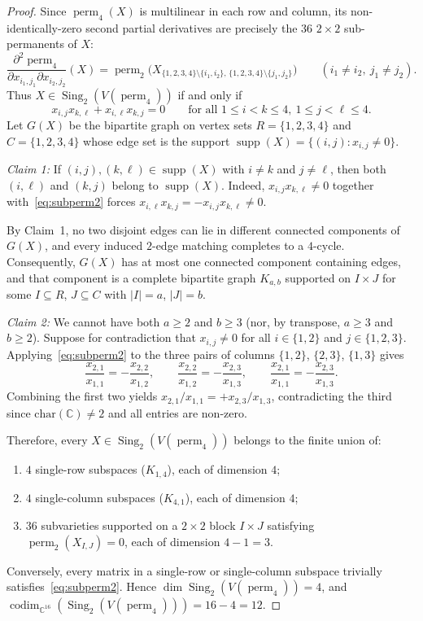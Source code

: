 \documentclass[11pt,a4paper]{article}
\theoremstyle{definition}
\DeclareMathOperator{\perm}{perm}
\DeclareMathOperator{\codim}{codim}
\DeclareMathOperator{\Sing}{Sing}
\DeclareMathOperator{\supp}{supp}
\begin{document}
\begin{proof}
Since $\perm_4(X)$ is multilinear in each row and column, its non-identically-zero second partial derivatives are precisely the $36$ $2 \times 2$ sub-permanents of $X$:
\[
  \frac{\partial^2 \perm_4}{\partial x_{i_1,j_1} \partial x_{i_2,j_2}}(X)
  = \perm_2\big(X_{\{1,2,3,4\}\setminus\{i_1,i_2\},\,\{1,2,3,4\}\setminus\{j_1,j_2\}}\big)
  \qquad (i_1 \neq i_2,\ j_1 \neq j_2).
\]
Thus $X \in \Sing_2(V(\perm_4))$ if and only if
\begin{equation}\label{eq:subperm2}
  x_{i,j} x_{k,\ell} + x_{i,\ell} x_{k,j} = 0 \qquad \text{for all } 1 \le i < k \le 4,\ 1 \le j < \ell \le 4.
\end{equation}
Let $G(X)$ be the bipartite graph on vertex sets $R = \{1,2,3,4\}$ and $C = \{1,2,3,4\}$ whose edge set is the support $\supp(X) = \{(i,j) : x_{i,j} \neq 0\}$.

\emph{Claim 1:} If $(i,j), (k,\ell) \in \supp(X)$ with $i \neq k$ and $j \neq \ell$, then both $(i,\ell)$ and $(k,j)$ belong to $\supp(X)$.  
Indeed, $x_{i,j} x_{k,\ell} \neq 0$ together with~\eqref{eq:subperm2} forces $x_{i,\ell} x_{k,j} = -x_{i,j} x_{k,\ell} \neq 0$.

By Claim~1, no two disjoint edges can lie in different connected components of $G(X)$, and every induced $2$-edge matching completes to a $4$-cycle. Consequently, $G(X)$ has at most one connected component containing edges, and that component is a complete bipartite graph $K_{a,b}$ supported on $I \times J$ for some $I \subseteq R$, $J \subseteq C$ with $|I| = a$, $|J| = b$.

\emph{Claim 2:} We cannot have both $a \ge 2$ and $b \ge 3$ (nor, by transpose, $a \ge 3$ and $b \ge 2$).  
Suppose for contradiction that $x_{i,j} \neq 0$ for all $i \in \{1,2\}$ and $j \in \{1,2,3\}$. Applying~\eqref{eq:subperm2} to the three pairs of columns $\{1,2\}$, $\{2,3\}$, $\{1,3\}$ gives
\[
  \frac{x_{2,1}}{x_{1,1}} = -\frac{x_{2,2}}{x_{1,2}}, \qquad
  \frac{x_{2,2}}{x_{1,2}} = -\frac{x_{2,3}}{x_{1,3}}, \qquad
  \frac{x_{2,1}}{x_{1,1}} = -\frac{x_{2,3}}{x_{1,3}}.
\]
Combining the first two yields $x_{2,1}/x_{1,1} = +x_{2,3}/x_{1,3}$, contradicting the third since $\mathrm{char}(\mathbb{C}) \neq 2$ and all entries are non-zero.

Therefore, every $X \in \Sing_2(V(\perm_4))$ belongs to the finite union of:
\begin{enumerate}
  \item $4$ single-row subspaces ($K_{1,4}$), each of dimension $4$;
  \item $4$ single-column subspaces ($K_{4,1}$), each of dimension $4$;
  \item $36$ subvarieties supported on a $2 \times 2$ block $I \times J$ satisfying $\perm_2(X_{I,J}) = 0$, each of dimension $4 - 1 = 3$.
\end{enumerate}
Conversely, every matrix in a single-row or single-column subspace trivially satisfies~\eqref{eq:subperm2}. Hence $\dim \Sing_2(V(\perm_4)) = 4$, and $\codim_{\mathbb{C}^{16}}(\Sing_2(V(\perm_4))) = 16 - 4 = 12$.
\end{proof}
\end{document}
